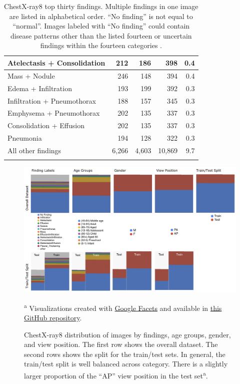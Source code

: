 \documentclass{article}
\begin{document}
\begin{singlespace}
{\begin{longtable}{lrrrr}
Atelectasis + Consolidation             & 212   & 186   & 398   & 0.4    \\ \midrule[0.1pt]
Mass + Nodule             & 246   & 148   & 394   & 0.4    \\
Edema + Infiltration      & 193   & 199   & 392   & 0.3    \\
Infiltration + Pneumothorax             & 188   & 157   & 345   & 0.3    \\
Emphysema + Pneumothorax  & 202   & 135   & 337   & 0.3    \\ \midrule[0.1pt]
Consolidation + Effusion  & 202   & 135   & 337   & 0.3    \\
Pneumonia               & 194   & 128   & 322   & 0.3   \\
\midrule
All other findings      & 6,266     & 4,603 & 10,869 & 9.7 \\
\bottomrule
\caption[ChestX-ray8 top thirty findings.]{ChestX-ray8 top thirty findings. Multiple findings in one image are listed in alphabetical order. ``No finding'' is not equal to ``normal''.  Images labeled with ``No finding'' could contain disease patterns other than the listed fourteen or uncertain findings within the fourteen categories \cite{HealthClinicalCenter2017}.}
\label{tab:chestX-ray8-diseases-breakdown}
\end{longtable}
} %
\end{singlespace}

\begin{figure}[!htb]
    \centering
    \includegraphics[width=0.9\columnwidth]{figures/chestX-ray8-overview.png}
    \caption[ChestX-ray8 image distribution by findings, age groups, gender, and view position.]{ChestX-ray8 distribution of images by findings, age groups, gender, and view position. The first row shows the overall dataset. The second rows shows the split for the train/test sets. In general, the train/test split is well balanced across category. There is a slightly larger proportion of the ``AP'' view position in the test set\textsuperscript{a}.}
    \scriptsize\textsuperscript{a} Visualizations created with \href{https://pair-code.github.io/facets/}{Google Facets} and available in \href{https://github.com/fau-masters-collected-works-cgarbin/dataset-visualization-faces-streamlit}{this GitHub repository}.
    \label{fig:chestX-ray8-overview}
\end{figure}
\end{document}
